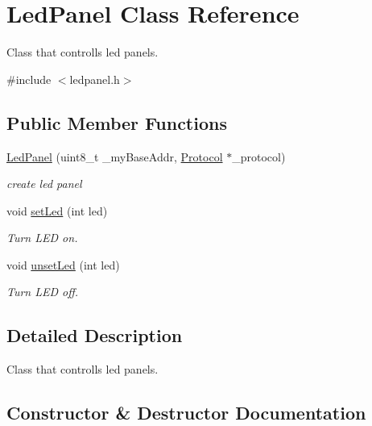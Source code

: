 \hypertarget{classLedPanel}{}\section{Led\+Panel Class Reference}
\label{classLedPanel}


Class that controlls led panels.  




{\ttfamily \#include $<$ledpanel.\+h$>$}

\subsection*{Public Member Functions}
\begin{DoxyCompactItemize}
\item 
\hyperlink{classLedPanel_a0c5b03edc36c54a449afb3b38bf5c609}{Led\+Panel} (uint8\+\_\+t \+\_\+my\+Base\+Addr, \hyperlink{classProtocol}{Protocol} $\ast$\+\_\+protocol)
\begin{DoxyCompactList}\small\item\em create led panel \end{DoxyCompactList}\item 
void \hyperlink{classLedPanel_aa6a5cdc73faf8e7f29c50c0410a63d92}{set\+Led} (int led)
\begin{DoxyCompactList}\small\item\em Turn L\+ED on. \end{DoxyCompactList}\item 
void \hyperlink{classLedPanel_a54fbf91ef395e20cc8fed89fe048df85}{unset\+Led} (int led)
\begin{DoxyCompactList}\small\item\em Turn L\+ED off. \end{DoxyCompactList}\end{DoxyCompactItemize}


\subsection{Detailed Description}
Class that controlls led panels. 

\subsection{Constructor \& Destructor Documentation}
\mbox{\label{classLedPanel_a0c5b03edc36c54a449afb3b38bf5c609}} 

